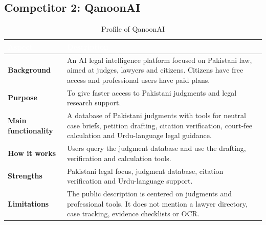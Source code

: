 \documentclass[12pt,a4paper]{report}
\newcommand{\thd}[1]{\textcolor{white}{\textbf{#1}}}
\newcommand{\headrow}{\rowcolor{tablehead}}
\begin{document}
\subsection*{Competitor 2: QanoonAI}
\begin{table}[H]
\centering
\caption{Profile of QanoonAI}
\label{tab:qanoonai}
\begin{tabular}{|L{3.4cm}|L{10.6cm}|}
\hline
\headrow \thd{Aspect} & \thd{Description} \\ \hline
\textbf{Background} & An AI legal intelligence platform focused on Pakistani law, aimed at judges, lawyers and citizens. Citizens have free access and professional users have paid plans. \\ \hline
{}\textbf{Purpose} & To give faster access to Pakistani judgments and legal research support. \\ \hline
\textbf{Main functionality} & A database of Pakistani judgments with tools for neutral case briefs, petition drafting, citation verification, court-fee calculation and Urdu-language legal guidance. \\ \hline
{}\textbf{How it works} & Users query the judgment database and use the drafting, verification and calculation tools. \\ \hline
\textbf{Strengths} & Pakistani legal focus, judgment database, citation verification and Urdu-language support. \\ \hline
{}\textbf{Limitations} & The public description is centered on judgments and professional tools. It does not mention a lawyer directory, case tracking, evidence checklists or OCR. \\ \hline
\end{tabular}
\end{table}
\end{document}
